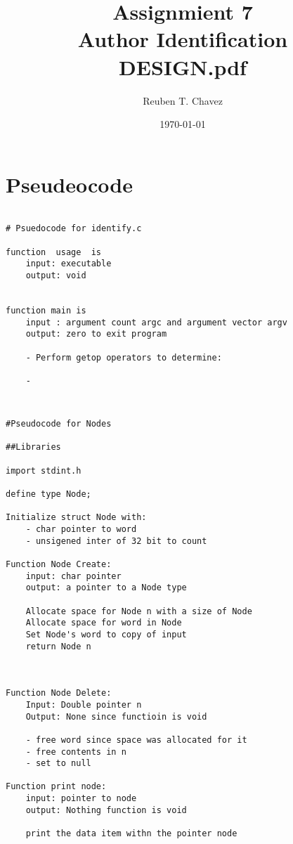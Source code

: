 \documentclass[11pt]{article} %
\title{Assignmient 7 \\
    \large Author Identification \\
    \textbf{DESIGN.pdf}}
\author{Reuben T. Chavez}
\date{\today} %
\begin{document}
\maketitle %

\pagebreak
\section*{Pseudeocode}
\begin{flushleft}

\begin{lstlisting}

# Psuedocode for identify.c

function  usage  is
    input: executable
    output: void


function main is
    input : argument count argc and argument vector argv
    output: zero to exit program

    - Perform getop operators to determine:

    - 
        
\end{lstlisting}

\begin{lstlisting}

\end{lstlisting}


\begin{lstlisting}
#Pseudocode for Nodes

##Libraries

import stdint.h

define type Node;

Initialize struct Node with:
    - char pointer to word
    - unsigened inter of 32 bit to count

Function Node Create:
    input: char pointer
    output: a pointer to a Node type
    
    Allocate space for Node n with a size of Node 
    Allocate space for word in Node
    Set Node's word to copy of input
    return Node n



Function Node Delete:
    Input: Double pointer n
    Output: None since functioin is void
    
    - free word since space was allocated for it
    - free contents in n
    - set to null

Function print node:
    input: pointer to node
    output: Nothing function is void

    print the data item withn the pointer node
\end{lstlisting}



\end{flushleft}
\end{document}
